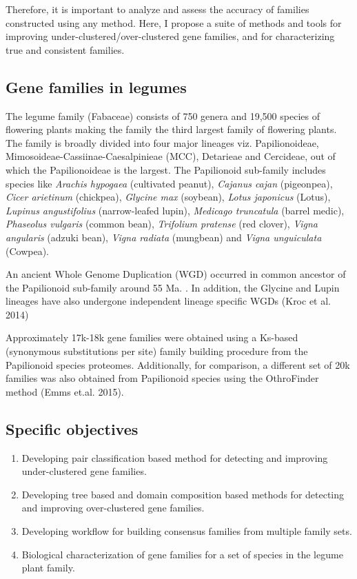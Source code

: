 \documentclass{article}
\begin{document}
		Therefore, it is important to analyze and assess the accuracy of families constructed using any method. Here, I propose a suite of methods and tools for improving under-clustered/over-clustered gene families, and for characterizing true and consistent families.
		
		\subsection{Gene families in legumes}
		The legume family (Fabaceae) consists of 750 genera and 19,500 species of flowering plants making the family the third largest family of flowering plants\citep{lewis2005legumes}. The family is broadly divided into four major lineages viz. Papilionoideae, Mimosoideae-Cassiinae-Caesalpinieae (MCC), Detarieae and Cercideae, out of which the Papilionoideae is the largest. The Papilionoid sub-family includes species like \textit{Arachis hypogaea} (cultivated peanut), \textit{Cajanus cajan} (pigeonpea), \textit{Cicer arietinum} (chickpea), \textit{Glycine max} (soybean), \textit{Lotus japonicus} (Lotus), \textit{Lupinus angustifolius} (narrow-leafed lupin), \textit{Medicago truncatula} (barrel medic), \textit{Phaseolus vulgaris} (common bean), \textit{Trifolium pratense} (red clover), \textit{Vigna angularis} (adzuki bean), \textit{Vigna radiata} (mungbean) and \textit{Vigna unguiculata} (Cowpea).
		
		An ancient Whole Genome Duplication (WGD) occurred in common ancestor of the Papilionoid sub-family around 55 Ma. \citep{blanc2004functional,schlueter2004mining,pfeil2005placing,cannon2006legume,bertioli2009analysis,cannon2014multiple}. In addition, the Glycine and Lupin lineages have also undergone independent lineage specific WGDs \citep{cannon2014multiple} (Kroc et al. 2014) 
		
		Approximately 17k-18k gene families were obtained using a Ks-based (synonymous substitutions per site) family building procedure from the Papilionoid species proteomes. Additionally, for comparison, a different set of 20k families was also obtained from Papilionoid species using the OthroFinder method (Emms et.al. 2015).
		
		\subsection{Specific objectives}
			\begin{enumerate}
				\item Developing pair classification based method for detecting and improving under-clustered gene families.
				
				\item Developing tree based and domain composition based methods for detecting  and improving over-clustered gene families.
				
				\item Developing workflow for building consensus families from multiple family sets.
				
				\item Biological characterization of gene families for a set of species in the legume plant family.
			\end{enumerate}
		
\end{document}
